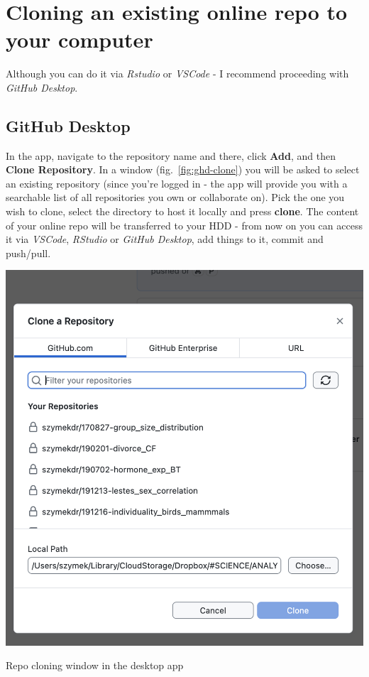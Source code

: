 \documentclass{tufte-handout}
\begin{document}
\section[Cloning a repo]{Cloning an existing online repo to your computer}\label{sec:cloning}
Although you can do it via \textit{Rstudio} or \textit{VSCode} - I recommend proceeding with \textit{GitHub Desktop}.

\subsection{GitHub Desktop}

In the app, navigate to the repository name and there, click \textbf{Add}, and then \textbf{Clone Repository}. In a window (fig.~\ref{fig:ghd-clone}) you will be asked to select an existing repository (since you're logged in - the app will provide you with a searchable list of all repositories you own or collaborate on). Pick the one you wish to clone, select the directory to host it locally and press \textbf{clone}. The content of your online repo will be transferred to your HDD - from now on you can access it via \textit{VSCode}, \textit{RStudio} or \textit{GitHub Desktop}, add things to it, commit and push/pull.

\begin{marginfigure}
    \includegraphics[width=1\linewidth]{Zrzut ekranu 2024-12-23 o 09.48.06.png}
    \caption{Repo cloning window in the desktop app}
    \label{fig:ghd-clone}
\end{marginfigure}
\end{document}

